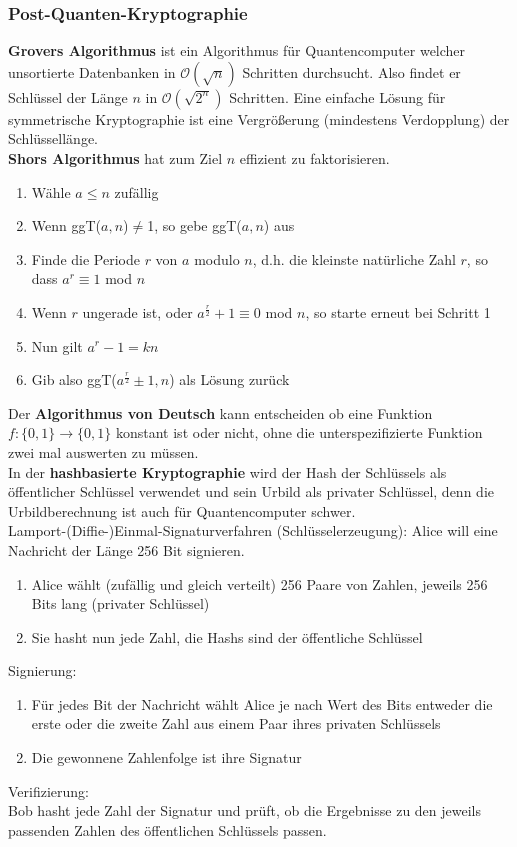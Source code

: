 \documentclass[a4paper,12pt,leqno]{article}
\begin{document}
\subsubsection{Post-Quanten-Kryptographie}
\textbf{Grovers Algorithmus} ist ein Algorithmus für Quantencomputer welcher unsortierte Datenbanken in $\mathcal{O}(\sqrt{n})$ Schritten durchsucht. Also findet er Schlüssel der Länge $n$ in $\mathcal{O}(\sqrt{2^n})$ Schritten. Eine einfache Lösung für symmetrische Kryptographie ist eine Vergrößerung (mindestens Verdopplung) der Schlüssellänge.\\ 

\textbf{Shors Algorithmus} hat zum Ziel $n$ effizient zu faktorisieren.
\begin{enumerate}
\item Wähle $a\leq n$ zufällig
\item Wenn ggT($a,n$)$\neq$1, so gebe ggT($a,n$) aus
\item Finde die Periode $r$ von $a$ modulo $n$, d.h. die kleinste natürliche Zahl $r$, so dass $a^r\equiv 1$ mod $n$
\item Wenn $r$ ungerade ist, oder $a^{\frac{r}{2}} + 1\equiv 0$ mod $n$, so starte erneut bei Schritt 1
\item Nun gilt $a^r-1=kn$
\item Gib also ggT($a^{\frac{r}{2}}\pm 1,n$) als Lösung zurück
\end{enumerate}

Der \textbf{Algorithmus von Deutsch} kann entscheiden ob eine Funktion $f: \{0,1\}\rightarrow\{0,1\}$ konstant ist oder nicht, ohne die unterspezifizierte Funktion zwei mal auswerten zu müssen.\\

In der \textbf{hashbasierte Kryptographie} wird der Hash der Schlüssels als öffentlicher Schlüssel verwendet und sein Urbild als privater Schlüssel, denn die Urbildberechnung ist auch für Quantencomputer schwer.\\
Lamport-(Diffie-)Einmal-Signaturverfahren (Schlüsselerzeugung):
Alice will eine Nachricht der Länge 256 Bit signieren.
\begin{enumerate}
\item Alice wählt (zufällig und gleich verteilt) 256 Paare von Zahlen, jeweils 256 Bits lang (privater Schlüssel)
\item Sie hasht nun jede Zahl, die Hashs sind der öffentliche Schlüssel
\end{enumerate}
Signierung:
\begin{enumerate}
\item Für jedes Bit der Nachricht wählt Alice je nach Wert des Bits entweder die erste oder die zweite Zahl aus einem Paar ihres privaten Schlüssels
\item Die gewonnene Zahlenfolge ist ihre Signatur
\end{enumerate}
Verifizierung:\\
Bob hasht jede Zahl der Signatur und prüft, ob die Ergebnisse zu den jeweils passenden Zahlen des öffentlichen Schlüssels passen.\\
\end{document}
